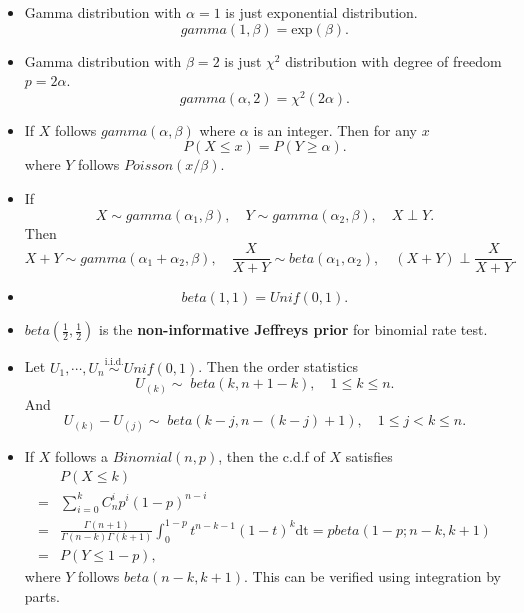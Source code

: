 \documentclass[a4paper,12pt]{article}
\begin{document}
\begin{itemize}
\item Gamma distribution with $\alpha = 1$ is just exponential distribution.
  \[
    gamma\left(1, \beta\right) = \mathrm{exp}\left(\beta\right)
    .
  \]
  
\item Gamma distribution with $\beta = 2$ is just $\chi^2$ distribution with degree of freedom $p = 2\alpha$.
  \[
    gamma\left(\alpha, 2\right) = \chi^2\left(2\alpha\right)
    .
  \]
  
\item If $X$ follows $gamma\left(\alpha, \beta\right)$ where $\alpha$ is an integer. Then for any $x$
  \[
    P\left(X \leq x\right) = P\left(Y \geq \alpha\right)
    .
  \]
  where $Y$ follows $Poisson\left(x / \beta\right)$.
  
\item If
  \[
    X \sim gamma\left(\alpha_1, \beta\right)
    ,\quad
    Y \sim gamma\left(\alpha_2, \beta\right)
    ,\quad
    X \perp Y
    .
  \]
  Then
  \[
    X + Y \sim gamma\left(\alpha_1 + \alpha_2, \beta\right)
    ,\quad
    \frac{X}{X + Y} \sim beta\left(\alpha_1, \alpha_2\right)
    ,\quad
    \left(X + Y\right) \perp \frac{X}{X + Y}
    .
  \]
\item
  \[
    beta\left(1, 1\right) = Unif\left(0, 1\right)
    .
  \]
  
\item $beta\left(\frac{1}{2}, \frac{1}{2}\right)$ is the \textbf{non-informative Jeffreys prior} for binomial rate test.
  
\item Let $U_1, \cdots, U_n \overset{\mathrm{i.i.d.}}{\sim} Unif(0, 1)$. Then the order statistics
  \[
    U_{\left(k\right)} \sim\; beta\left(k, n + 1 - k\right)
    ,\quad
    1\leq k \leq n
    .
  \]
  And
  \[
    U_{\left(k\right)} - U_{\left(j\right)}
    \sim\; beta\left(k - j, n - \left(k - j\right) + 1\right)
    ,\quad
    1 \leq j < k \leq n
    .
  \]
  
\item If $X$ follows a $Binomial(n, p)$, then the c.d.f of $X$ satisfies
  \[
    \begin{aligned}
      & P\left(X \leq k\right)    \\
      =& \sum\limits_{i = 0}^kC_{n}^ip^i\left(1 - p\right)^{n - i}    \\
      =& \frac{
        \Gamma\left(n + 1\right)
      }{
        \Gamma\left(n - k\right)\Gamma\left(k + 1\right)
      }
      \int_0^{1 - p}t^{n - k - 1}\left(1 - t\right)^k\mathrm{dt}
      = pbeta\left(1 - p; n-k, k + 1\right)    \\
      =& P\left(Y \leq 1 - p\right)
      ,
    \end{aligned}
  \]
  where $Y$ follows $beta\left(n - k, k + 1\right)$. This can be verified using integration by parts.
\end{itemize}



\end{document}
